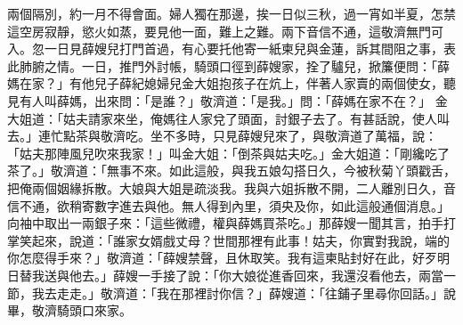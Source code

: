 兩個隔別，約一月不得會面。婦人獨在那邊，挨一日似三秋，過一宵如半夏，怎禁這空房寂靜，慾火如蒸，要見他一面，難上之難。兩下音信不通，這敬濟無門可入。忽一日見薛嫂兒打門首過，有心要托他寄一紙柬兒與金蓮，訴其間阻之事，表此肺腑之情。一日，推門外討帳，騎頭口徑到薛嫂家，拴了驢兒，掀簾便問：「薛媽在家？」有他兒子薛紀媳婦兒金大姐抱孩子在炕上，伴著人家賣的兩個使女，聽見有人叫薛媽，出來問：「是誰？」敬濟道：「是我。」問：「薛媽在家不在？」 金大姐道：「姑夫請家來坐，俺媽往人家兌了頭面，討銀子去了。有甚話說，使人叫去。」連忙點茶與敬濟吃。坐不多時，只見薛嫂兒來了，與敬濟道了萬福，說： 「姑夫那陣風兒吹來我家！」叫金大姐：「倒茶與姑夫吃。」金大姐道：「剛纔吃了茶了。」敬濟道：「無事不來。如此這般，與我五娘勾搭日久，今被秋菊丫頭戳舌，把俺兩個姻緣拆散。大娘與大姐是疏淡我。我與六姐拆散不開，二人離別日久，音信不通，欲稍寄數字進去與他。無人得到內里，須央及你，如此這般通個消息。」向袖中取出一兩銀子來：「這些微禮，權與薛媽買茶吃。」那薛嫂一聞其言，拍手打掌笑起來，說道：「誰家女婿戲丈母？世間那裡有此事！姑夫，你實對我說，端的你怎麼得手來？」敬濟道：「薛嫂禁聲，且休取笑。我有這柬貼封好在此，好歹明日替我送與他去。」薛嫂一手接了說：「你大娘從進香回來，我還沒看他去，兩當一節，我去走走。」敬濟道：「我在那裡討你信？」薛嫂道：「往鋪子里尋你回話。」說畢，敬濟騎頭口來家。

